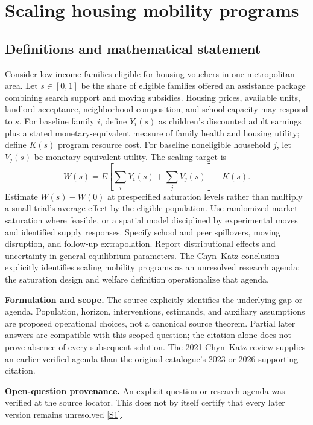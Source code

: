 \documentclass[11pt]{article}
\newcommand{\sref}[2]{\hyperlink{source:#1:#2}{[S#2]}}
\begin{document}
\section*{Scaling housing mobility programs}\label{30007746}
\subsection{Definitions and mathematical statement}
Consider low-income families eligible for housing vouchers in one metropolitan area. Let \(s\in[0,1]\) be the share of eligible families offered an assistance package combining search support and moving subsidies. Housing prices, available units, landlord acceptance, neighborhood composition, and school capacity may respond to \(s\). For baseline family \(i\), define \(Y_i(s)\) as children’s discounted adult earnings plus a stated monetary-equivalent measure of family health and housing utility; define \(K(s)\) program resource cost. For baseline noneligible household \(j\), let \(V_j(s)\) be monetary-equivalent utility. The scaling target is
\[W(s)=E\!\left[\sum_iY_i(s)+\sum_jV_j(s)\right]-K(s).\]
Estimate \(W(s)-W(0)\) at prespecified saturation levels rather than multiply a small trial’s average effect by the eligible population. Use randomized market saturation where feasible, or a spatial model disciplined by experimental moves and identified supply responses. Specify school and peer spillovers, moving disruption, and follow-up extrapolation. Report distributional effects and uncertainty in general-equilibrium parameters. The Chyn–Katz conclusion explicitly identifies scaling mobility programs as an unresolved research agenda; the saturation design and welfare definition operationalize that agenda.

\par\textbf{Formulation and scope.} The source explicitly identifies the underlying gap or agenda. Population, horizon, interventions, estimands, and auxiliary assumptions are proposed operational choices, not a canonical source theorem. Partial later answers are compatible with this scoped question; the citation alone does not prove absence of every subsequent solution. The 2021 Chyn–Katz review supplies an earlier verified agenda than the original catalogue’s 2023 or 2026 supporting citation.

\par\textbf{Open-question provenance.} An explicit question or research agenda was verified at the source locator. This does not by itself certify that every later version remains unresolved \sref{30007746}{1}.
\end{document}
